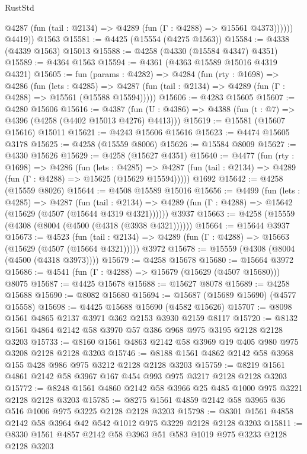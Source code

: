 \begin{lexlean}{RustStd}
\begin{coremodule}
{\begin{coremodule}
{{{{{{{{{{{{{{{{              @4287 (fun (tail : @2134) => @4289 (fun (Γ : @4288) => @15561 @4373))))))
        @4419))
    @1563
@15581 := @4425 (@15554 (@4275 @1563))
@15584 := @4338 (@4339 @1563) @15013
@15588 := @4258 (@4330 (@15584 @4347) @4351)
@15589 := @4364 @1563
@15594 := @4361 (@4363 @15589 @15016 @4319 @4321)
@15605 := fun (params : @4282) =>
  @4284
    (fun (rty : @1698) =>
    @4286
      (fun (lets : @4285) =>
      @4287 (fun (tail : @2134) => @4289 (fun (Γ : @4288) => @15561 (@15588 @15594)))))
@15606 := @4283 @15605
@15607 := @4280 @15606
@15616 := @4387
    (fun (U : @4386) => @4388 (fun (t : @7) => @4396 (@4258 (@4402 @15013 @4276) @4413)))
@15619 := @15581 (@15607 @15616) @15011
@15621 := @4243 @15606 @15616
@15623 := @4474 @15605 @3178
@15625 := @4258 (@15559 @8006)
@15626 := @15584 @8009
@15627 := @4330 @15626
@15629 := @4258 (@15627 @4351)
@15640 := @4477
    (fun (rty : @1698) =>
    @4286
      (fun (lets : @4285) =>
      @4287 (fun (tail : @2134) => @4289 (fun (Γ : @4288) => @15625 (@15629 @15594)))))
    @1692
@15642 := @4258 (@15559 @8026)
@15644 := @4508 @15589 @15016
@15656 := @4499
    (fun (lets : @4285) =>
    @4287
      (fun (tail : @2134) =>
      @4289 (fun (Γ : @4288) => @15642 (@15629 (@4507 (@15644 @4319 @4321))))))
    @3937
@15663 := @4258 (@15559 (@4308 (@8004 (@4500 (@4318 (@3938 @4321))))))
@15664 := @15644 @3937
@15673 := @4523
    (fun (tail : @2134) => @4289 (fun (Γ : @4288) => @15663 (@15629 (@4507 (@15664 @4321)))))
    @3972
@15678 := @15559 (@4308 (@8004 (@4500 (@4318 @3973))))
@15679 := @4258 @15678
@15680 := @15664 @3972
@15686 := @4541 (fun (Γ : @4288) => @15679 (@15629 (@4507 @15680))) @8075
@15687 := @4425 @15678
@15688 := @15627 @8078
@15689 := @4258 @15688
@15690 := @8082 @15680
@15694 := @15687 (@15689 @15690) (@4577 @15558)
@15698 := @4425 @15688 @15690 (@4582 @15626)
@15707 := @8098 @1561 @4865 @2137 @3971 @362 @2153 @3930 @2159 @8117
@15720 := @8132 @1561 @4864 @2142 @58 @3970 @57 @386 @968 @975 @3195 @2128 @2128 @3203
@15733 := @8160 @1561 @4863 @2142 @58 @3969 @19 @405 @980 @975 @3208 @2128 @2128 @3203
@15746 := @8188 @1561 @4862 @2142 @58 @3968 @155 @428 @986 @975 @3212 @2128 @2128 @3203
@15759 := @8219 @1561 @4861 @2142 @58 @3967 @167 @454 @993 @975 @3217 @2128 @2128 @3203
@15772 := @8248 @1561 @4860 @2142 @58 @3966 @25 @485 @1000 @975 @3221 @2128 @2128 @3203
@15785 := @8275 @1561 @4859 @2142 @58 @3965 @36 @516 @1006 @975 @3225 @2128 @2128 @3203
@15798 := @8301 @1561 @4858 @2142 @58 @3964 @42 @542 @1012 @975 @3229 @2128 @2128 @3203
@15811 := @8330 @1561 @4857 @2142 @58 @3963 @51 @583 @1019 @975 @3233 @2128 @2128 @3203
}}}}}}}}}}}}}}}}
\end{coremodule}}
\end{coremodule}
\end{lexlean}
